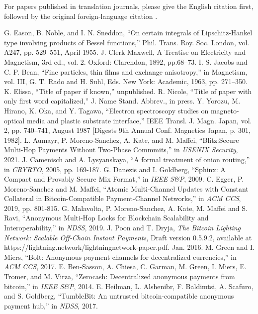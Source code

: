 \documentclass[conference]{IEEEtran}
\begin{document}
For papers published in translation journals, please give the English 
citation first, followed by the original foreign-language citation \cite{b6}.

\begin{thebibliography}{99}
 G. Eason, B. Noble, and I. N. Sneddon, ``On certain integrals of Lipschitz-Hankel type involving products of Bessel functions,'' Phil. Trans. Roy. Soc. London, vol. A247, pp. 529--551, April 1955.
 J. Clerk Maxwell, A Treatise on Electricity and Magnetism, 3rd ed., vol. 2. Oxford: Clarendon, 1892, pp.68--73.
 I. S. Jacobs and C. P. Bean, ``Fine particles, thin films and exchange anisotropy,'' in Magnetism, vol. III, G. T. Rado and H. Suhl, Eds. New York: Academic, 1963, pp. 271--350.
 K. Elissa, ``Title of paper if known,'' unpublished.
 R. Nicole, ``Title of paper with only first word capitalized,'' J. Name Stand. Abbrev., in press.
 Y. Yorozu, M. Hirano, K. Oka, and Y. Tagawa, ``Electron spectroscopy studies on magneto-optical media and plastic substrate interface,'' IEEE Transl. J. Magn. Japan, vol. 2, pp. 740--741, August 1987 [Digests 9th Annual Conf. Magnetics Japan, p. 301, 1982].
 L. Aumayr, P. Moreno-Sanchez, A. Kate, and M. Maffei, ``Blitz:Secure Multi-Hop Payments Without Two-Phase Commmits,'' in \textit{USENIX Security}, 2021.
 J. Camenisch and A. Lysyanskaya, ``A formal treatment of onion routing,'' in \textit{CRYRTO}, 2005, pp. 169-187. 
 G. Danezis and I. Goldberg, ``Sphinx: A Compact and Provably Secure Mix Format,'' in \textit{IEEE S\&P}, 2009. 
 C. Egger, P. Moreno-Sanchez and M. Maffei, ``Atomic Multi-Channel Updates with Constant Collateral in Bitcoin-Compatible Payment-Channel Networks,'' in \textit{ACM CCS}, 2019, pp. 801-815.
 G. Malavolta, P. Moreno-Sanchez, A. Kate, M. Maffei and S. Ravi, ``Anonymous Multi-Hop Locks for Blockchain Scalability and Interoperability,'' in \textit{NDSS}, 2019.
 J. Poon and T. Dryja, \textit{The Bitcoin Lighting Network: Scalable Off-Chain Instant Payments}, Draft version 0.5.9.2, available at https://lightning.network/lightningnetwork-paper.pdf. Jan. 2016. 
 M. Green and I. Miers, ``Bolt: Anonymous payment channels for decentralized currencies,'' in \textit{ACM CCS}, 2017. 
 E. Ben-Sasson, A. Chiesa, C. Garman, M. Green, I. Miers, E. Tromer, and M. Virza, ``Zerocash: Decentralized anonymous payments from bitcoin,'' in \textit{IEEE S\&P}, 2014.
 E. Heilman, L. Alshenibr, F. Baldimtsi, A. Scafuro, and S. Goldberg, ``TumbleBit: An untrusted bitcoin-compatible anonymous payment hub,'' in \textit{NDSS}, 2017.

\end{thebibliography}
\end{document}
